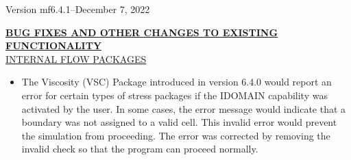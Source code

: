 	
	\item Version mf6.4.1--December 7, 2022
	


	\textbf{\underline{BUG FIXES AND OTHER CHANGES TO EXISTING FUNCTIONALITY}} \\


	\underline{INTERNAL FLOW PACKAGES}
	\begin{itemize}
		\item The Viscosity (VSC) Package introduced in version 6.4.0 would report an error for certain types of stress packages if the IDOMAIN capability was activated by the user.  In some cases, the error message would indicate that a boundary was not assigned to a valid cell.  This invalid error would prevent the simulation from proceeding.  The error was corrected by removing the invalid check so that the program can proceed normally.
	\end{itemize}


